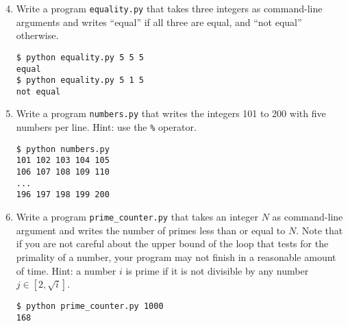 \documentclass[8pt,a4paper,compress]{beamer}
\begin{document}
\begin{frame}[fragile]
\begin{enumerate}\setcounter{enumi}{3}
\item Write a program \lstinline{equality.py} that takes three integers as command-line arguments and writes ``equal'' if all three are equal, and ``not equal'' otherwise. 
\begin{lstlisting}[language={}]
$ python equality.py 5 5 5
equal
$ python equality.py 5 1 5
not equal
\end{lstlisting}

\item Write a program \lstinline{numbers.py} that writes the integers 101 to 200 with five numbers per line. Hint: use the \lstinline{%} operator. 

\begin{lstlisting}[language={}]
$ python numbers.py
101 102 103 104 105
106 107 108 109 110
...
196 197 198 199 200
\end{lstlisting}

\item Write a program \lstinline{prime_counter.py} that takes 
an integer $N$ as command-line argument and writes the number of primes less than or equal to $N$. Note that if you are not careful about the upper bound of the loop that tests for the primality of a number, your program may not finish in a reasonable amount of time. Hint: a number $i$ is prime if it is not divisible by any number $j \in [2, \sqrt{i}]$.
\begin{lstlisting}[language={}]
$ python prime_counter.py 1000
168
\end{lstlisting}
\end{enumerate}
\end{frame}
\end{document}
